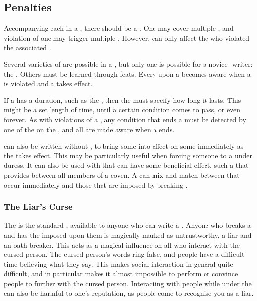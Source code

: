 \subsection{Penalties}

Accompanying each {\stipulation} in a {\contract}, there should be a {\contractpenalty}.
One {\contractpenalty} may cover multiple {\stipulations}, and violation of one {\stipulation} may trigger multiple {\penalties}.
However, {\penalties} can only affect the {\signatories} who violated the associated {\stipulations}.

Several varieties of {\contractpenalty} are possible in a {\contract}, but only one is possible for a novice {\contract}-writer: the {\liarscurse}.
Others must be learned through feats.
Every {\signatory} upon a {\contract} becomes aware when a {\stipulation} is violated and a {\contractpenalty} takes effect.

If a {\contractpenalty} has a duration, such as the {\liarscurse}, then the {\contract} must specify how long it lasts.
This might be a set length of time, until a certain condition comes to pass, or even forever.
As with violations of a {\stipulation}, any condition that ends a {\contractpenalty} must be detected by one of the {\signatories} on the {\contract}, and all {\signatories} are made aware when a {\contractpenalty} ends.

\capital{\contracts} can also be written without {\stipulations}, to bring some {\penalties} into effect on some {\signatories} immediately as the {\contract} takes effect.
This may be particularly useful when forcing someone to {\sign} a {\contract} under duress.
It can also be used with {\penalties} that can have some beneficial effect, such a {\contract} that provides  between all members of a coven.
A {\contract} can mix and match between {\penalties} that occur immediately and those that are imposed by breaking {\stipulations}.

\subsubsection{The Liar's Curse}

The {\liarscurse} is the standard {\contractpenalty}, available to anyone who can write a {\contract}.
Anyone who breaks a {\contract} and has the {\liarscurse} imposed upon them is magically marked as untrustworthy, a liar and an oath breaker.
This acts as a magical influence on all who interact with the cursed person.
The cursed person's words ring false, and people have a difficult time believing what they say.
This makes social interaction in general quite difficult, and in particular makes it almost impossible to perform  or convince people to {\sign} further {\contracts} with the cursed person.
Interacting with people while under the {\liarscurse} can also be harmful to one's reputation, as people come to recognise you as a liar.

